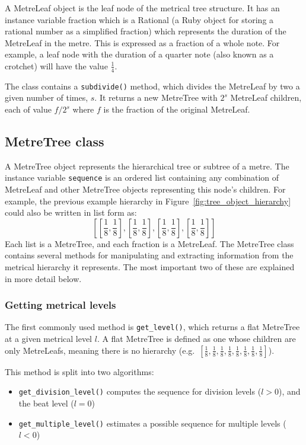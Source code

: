 \documentclass[12pt,twoside,openright]{report}
\begin{document}
A MetreLeaf object is the leaf node of the metrical tree structure. It has an
instance variable fraction which is a Rational (a Ruby object for storing a
rational number as a simplified fraction) which represents the duration of the
MetreLeaf in the metre. This is expressed as a fraction of a whole note. For
example, a leaf node with the duration of a quarter note (also known as a
crotchet) will have the value $\frac{1}{4}$.

The class contains a \verb'subdivide()' method, which divides the MetreLeaf by two a
given number of times, $s$. It returns a new MetreTree with $2^s$ MetreLeaf children, each of value $f/2^s$ where $f$ is the fraction of the original MetreLeaf.


\subsection{MetreTree class} \label{metretree}

A MetreTree object represents the hierarchical tree or subtree of a metre. The
instance variable \verb'sequence' is an ordered list containing any combination of
MetreLeaf and other MetreTree objects representing this node's children. For
example, the previous example hierarchy in Figure~\ref{fig:tree_object_hierarchy} could also be written in list form as:
\[\left[\left[\frac{1}{8},\frac{1}{8}\right],\left[\frac{1}{8},\frac{1}{8}\right],\left[\frac{1}{8},\frac{1}{8}\right],\left[\frac{1}{8},\frac{1}{8}\right]\right]\]
Each list is a
MetreTree, and each fraction is a MetreLeaf. The MetreTree class contains
several methods for manipulating and extracting information from the metrical
hierarchy it represents. The most important two of these are explained in more
detail below.

\subsubsection{Getting metrical levels} \label{get_level}

The first commonly used method is \verb'get_level()', which returns a flat MetreTree at
a given metrical level $l$. A flat MetreTree is defined as one whose children are
only MetreLeafs, meaning there is no hierarchy (e.g.\ $\left[\frac{1}{8},\frac{1}{8},\frac{1}{8},\frac{1}{8},\frac{1}{8},\frac{1}{8},\frac{1}{8},\frac{1}{8}\right]$).

This method is split into two algorithms:
\begin{itemize}
    \item \verb'get_division_level()' computes the sequence for division levels ($l>0$), and the beat level ($l=0$)
	\item \verb'get_multiple_level()' estimates a possible sequence for multiple levels ($l<0$)
\end{itemize}
\end{document}
